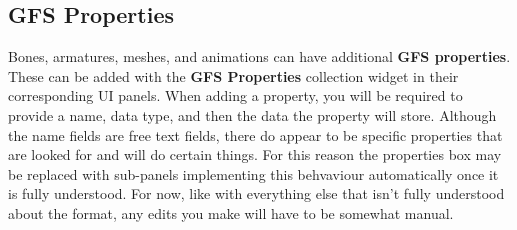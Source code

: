 \documentclass{article}
\newenvironment{guide}[1]
{
	\begin{center}
		\begin{tcolorbox}[%
			colback=black!20, 
			boxrule=0pt, 
			title=Step-by-step: #1,
			enhanced,
			breakable,
			overlay unbroken={%
                \draw[line width=1pt, black, rounded corners]
        	    (frame.north west) rectangle (frame.south east);
			},
    		overlay first={%
        		 \draw[line width=1pt, black, rounded corners]
        	    (frame.south west) -- (frame.north west) -- (frame.north east) -- (frame.south east);
                \draw[line width=1pt, black]
                (frame.south west) -- (frame.south east);
            },
    		overlay middle={%
                \draw[line width=1pt, black]
        	    (frame.north west) rectangle (frame.south east);
        	},
    		overlay last={%
                \draw[line width=1pt, black, rounded corners]
        	    (frame.north west) -- (frame.south west) -- (frame.south east) -- (frame.north east);
                \draw[line width=1pt, black]
                (frame.north west) -- (frame.north east);
           	}
        ]{}
    	\begin{enumerate}
}
{
    		\end{enumerate}
    	\end{tcolorbox}
	\end{center}  	 
}
\newcommand{\guideimage}[1]
{
	\begin{center}
		\texttt{[image: \#1]}
	\end{center}
}
\newcommand*\keystroke[1]
{
	\raisebox{-1.5pt}
	{
		\hspace{-8pt}
		\begin{tikzpicture}
		\node
		[
			draw,
			fill=black!65,
			drop shadow={shadow xshift=0.25ex,shadow yshift=-0.25ex,fill=black,opacity=0.75},
      		rectangle,
      		rounded corners=2pt,
      		inner sep=3pt,
      		outer sep=0pt,
      		line width=0.5pt,
      		font=\scriptsize\sffamily,
      		text=black!10
    	]
    	{
    		\hspace*{0.5pt}\tt #1\hspace*{0.5pt}
    	}
    	;
    	\end{tikzpicture}
		\hspace{-8pt}
  	}
}
\begin{document}


\clearpage

\subsection{GFS Properties}
\label{SECTION::GfsProperties}
Bones, armatures, meshes, and animations can have additional \textbf{GFS properties}. These can be added with the \textbf{GFS Properties} collection widget in their corresponding UI panels. When adding a property, you will be required to provide a name, data type, and then the data the property will store. Although the name fields are free text fields, there do appear to be specific properties that are looked for and will do certain things. For this reason the properties box may be replaced with sub-panels implementing this behvaviour automatically once it is fully understood. For now, like with everything else that isn't fully understood about the format, any edits you make will have to be somewhat manual.
\end{document}
